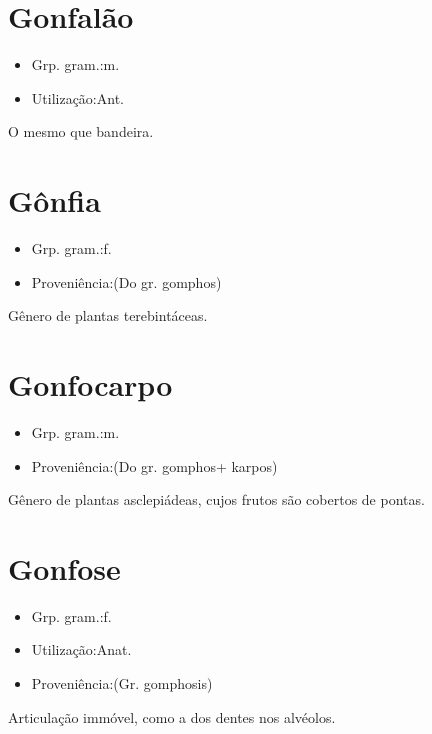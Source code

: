 \section{Gonfalão}
\begin{itemize}
\item {Grp. gram.:m.}
\end{itemize}
\begin{itemize}
\item {Utilização:Ant.}
\end{itemize}
O mesmo que \textunderscore bandeira\textunderscore .
\section{Gônfia}
\begin{itemize}
\item {Grp. gram.:f.}
\end{itemize}
\begin{itemize}
\item {Proveniência:(Do gr. \textunderscore gomphos\textunderscore )}
\end{itemize}
Gênero de plantas terebintáceas.
\section{Gonfocarpo}
\begin{itemize}
\item {Grp. gram.:m.}
\end{itemize}
\begin{itemize}
\item {Proveniência:(Do gr. \textunderscore gomphos\textunderscore  + \textunderscore karpos\textunderscore )}
\end{itemize}
Gênero de plantas asclepiádeas, cujos frutos são cobertos de pontas.
\section{Gonfose}
\begin{itemize}
\item {Grp. gram.:f.}
\end{itemize}
\begin{itemize}
\item {Utilização:Anat.}
\end{itemize}
\begin{itemize}
\item {Proveniência:(Gr. \textunderscore gomphosis\textunderscore )}
\end{itemize}
Articulação immóvel, como a dos dentes nos alvéolos.
